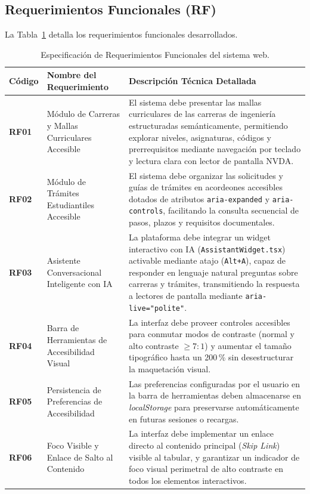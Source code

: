 \subsection{Requerimientos Funcionales (RF)}
La Tabla~\ref{tab:req_funcionales} detalla los requerimientos funcionales desarrollados.

\begin{table}[htbp]
  \centering
  \small
  \caption{Especificación de Requerimientos Funcionales del sistema web.}
  \label{tab:req_funcionales}
  \setlength{\tabcolsep}{4pt}
  \renewcommand{\arraystretch}{1.25}
  \begin{tabular}{|p{}|p{}|p{}|}
    \hline
    \textbf{Código} & \textbf{Nombre del Requerimiento} & \textbf{Descripción Técnica Detallada} \\
    \hline
    \textbf{RF01} & Módulo de Carreras y Mallas Curriculares Accesible & El sistema debe presentar las mallas curriculares de las carreras de ingeniería estructuradas semánticamente, permitiendo explorar niveles, asignaturas, códigos y prerrequisitos mediante navegación por teclado y lectura clara con lector de pantalla NVDA. \\
    \hline
    \textbf{RF02} & Módulo de Trámites Estudiantiles Accesible & El sistema debe organizar las solicitudes y guías de trámites en acordeones accesibles dotados de atributos \texttt{aria-expanded} y \texttt{aria-controls}, facilitando la consulta secuencial de pasos, plazos y requisitos documentales. \\
    \hline
    \textbf{RF03} & Asistente Conversacional Inteligente con IA & La plataforma debe integrar un widget interactivo con IA (\texttt{AssistantWidget.tsx}) activable mediante atajo (\texttt{Alt+A}), capaz de responder en lenguaje natural preguntas sobre carreras y trámites, transmitiendo la respuesta a lectores de pantalla mediante \texttt{aria-live="polite"}. \\
    \hline
    \textbf{RF04} & Barra de Herramientas de Accesibilidad Visual & La interfaz debe proveer controles accesibles para conmutar modos de contraste (normal y alto contraste $\ge 7:1$) y aumentar el tamaño tipográfico hasta un 200\,\% sin desestructurar la maquetación visual. \\
    \hline
    \textbf{RF05} & Persistencia de Preferencias de Accesibilidad & Las preferencias configuradas por el usuario en la barra de herramientas deben almacenarse en \textit{localStorage} para preservarse automáticamente en futuras sesiones o recargas. \\
    \hline
    \textbf{RF06} & Foco Visible y Enlace de Salto al Contenido & La interfaz debe implementar un enlace directo al contenido principal (\textit{Skip Link}) visible al tabular, y garantizar un indicador de foco visual perimetral de alto contraste en todos los elementos interactivos. \\
    \hline
  \end{tabular}
\end{table}

